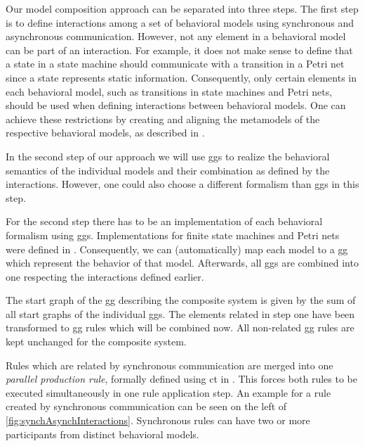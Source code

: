 \documentclass[a4paper]{easychair}
\begin{document}
Our model composition approach can be separated into three steps.
The first step is to define interactions among a set of behavioral models using synchronous and asynchronous communication.
However, not any element in a behavioral model can be part of an interaction.
For example, it does not make sense to define that a state in a state machine should communicate with a transition in a Petri net since a state represents static information.
Consequently, only certain elements in each behavioral model, such as transitions in state machines and Petri nets, should be used when defining interactions between behavioral models.
One can achieve these restrictions by creating and aligning the metamodels of the respective behavioral models, as described in \cite{krauterBehavioralConsistencyHeterogeneous2021}.

In the second step of our approach we will use \glspl{gg} to realize the behavioral semantics of the individual models and their combination as defined by the interactions.
However, one could also choose a different formalism than \glspl{gg} in this step.

For the second step there has to be an implementation of each behavioral formalism using \glspl{gg}.
Implementations for finite state machines and Petri nets were defined in \cite{krauterBehavioralConsistencyHeterogeneous2021}.
Consequently, we can (automatically) map each model to a \gls{gg} which represent the behavior of that model.
Afterwards, all \glspl{gg} are combined into one respecting the interactions defined earlier.

The start graph of the \gls{gg} describing the composite system is given by the sum of all start graphs of the individual \glspl{gg}.
The elements related in step one have been transformed to \gls{gg} rules which will be combined now.
All non-related \gls{gg} rules are kept unchanged for the composite system.

Rules which are related by synchronous communication are merged into one \textit{parallel production rule}, formally defined using \gls{ct} in \cite[Def. 3.2.7]{baldanConcurrentSemanticsAlgebraic1999}.
This forces both rules to be executed simultaneously in one rule application step. 
An example for a rule created by synchronous communication can be seen on the left of \autoref{fig:synchAsynchInteractions}.
Synchronous rules can have two or more participants from distinct behavioral models.  
\end{document}
